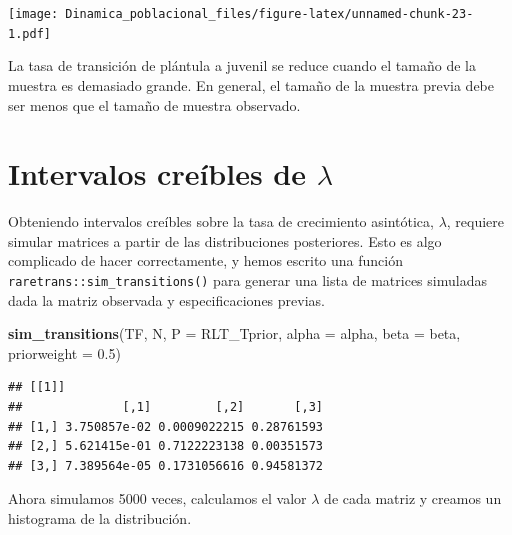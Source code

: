 \documentclass[
]{book}
\newenvironment{Shaded}{\begin{snugshade}}{\end{snugshade}}
\newcommand{\AttributeTok}[1]{\textcolor[rgb]{0.13,0.29,0.53}{#1}}
\newcommand{\FloatTok}[1]{\textcolor[rgb]{0.00,0.00,0.81}{#1}}
\newcommand{\FunctionTok}[1]{\textcolor[rgb]{0.13,0.29,0.53}{\textbf{#1}}}
\newcommand{\NormalTok}[1]{#1}
\theoremstyle{definition}
\theoremstyle{definition}
\theoremstyle{definition}
\theoremstyle{definition}
\theoremstyle{remark}
\begin{document}
\texttt{[image: Dinamica\_poblacional\_files/figure-latex/unnamed-chunk-23-1.pdf]}

La tasa de transición de plántula a juvenil se reduce cuando el tamaño de la muestra es demasiado grande. En general, el tamaño de la muestra previa debe ser menos que el tamaño de muestra observado.

\hypertarget{intervalos-creuxedbles-de-lambda}{%
\section{\texorpdfstring{Intervalos creíbles de \(\lambda\)}{Intervalos creíbles de \textbackslash lambda}}\label{intervalos-creuxedbles-de-lambda}}

Obteniendo intervalos creíbles sobre la tasa de crecimiento asintótica, \(\lambda\), requiere simular matrices a partir de las distribuciones posteriores. Esto es algo complicado de hacer correctamente, y hemos escrito una función \texttt{raretrans::sim\_transitions()} para generar una lista de matrices simuladas dada la matriz observada y especificaciones previas.

\begin{Shaded}
\begin{Highlighting}[]
\FunctionTok{sim\_transitions}\NormalTok{(TF, N, }\AttributeTok{P =}\NormalTok{ RLT\_Tprior, }\AttributeTok{alpha =}\NormalTok{ alpha, }\AttributeTok{beta =}\NormalTok{ beta,}
                \AttributeTok{priorweight =} \FloatTok{0.5}\NormalTok{)}
\end{Highlighting}
\end{Shaded}

\begin{verbatim}
## [[1]]
##              [,1]         [,2]       [,3]
## [1,] 3.750857e-02 0.0009022215 0.28761593
## [2,] 5.621415e-01 0.7122223138 0.00351573
## [3,] 7.389564e-05 0.1731056616 0.94581372
\end{verbatim}

Ahora simulamos 5000 veces, calculamos el valor \(\lambda\) de cada
matriz y creamos un histograma de la distribución.
\end{document}

